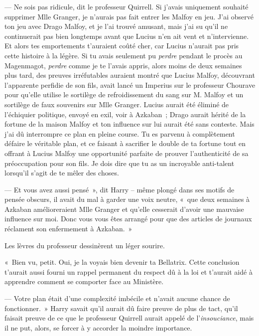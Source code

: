 --- Ne sois pas ridicule, dit le professeur Quirrell.
Si j'avais uniquement souhaité supprimer Mlle Granger, je n'aurais pas fait entrer les Malfoy en jeu.
J'ai observé ton jeu avec Drago Malfoy, et je l'ai trouvé amusant, mais j'ai su qu'il ne continuerait pas bien longtemps avant que Lucius n'en ait vent et n'intervienne.
Et alors tes emportements t'auraient coûté cher, car Lucius n'aurait pas pris cette histoire à la légère.
Si tu avais seulement pu \emph{perdre} pendant le procès au Magenmagot, \emph{perdre} comme je te l'avais appris, alors moins de deux semaines plus tard, des preuves irréfutables auraient montré que Lucius Malfoy, découvrant l'apparente perfidie de son fils, avait lancé un Imperius sur le professeur Chourave pour qu'elle utilise le sortilège de refroidissement du sang sur M. Malfoy et un sortilège de faux souvenirs sur Mlle Granger.
Lucius aurait été éliminé de l'échiquier politique, envoyé en exil, voir à Azkaban~; Drago aurait hérité de la fortune de la maison Malfoy et ton influence sur lui aurait été sans conteste.
Mais j'ai dû interrompre ce plan en pleine course.
Tu es parvenu à complètement défaire le véritable plan, et ce faisant à sacrifier le double de ta fortune tout en offrant à Lucius Malfoy une opportunité parfaite de prouver l'authenticité de sa préoccupation pour son fils.
Je dois dire que tu as un incroyable anti-talent lorsqu'il s'agit de te mêler des choses.

--- Et vous avez aussi pensé~», dit Harry -- même plongé dans ses motifs de pensée obscurs, il avait du mal à garder une voix neutre, «~que deux semaines à Azkaban amélioreraient Mlle Granger et qu'elle cesserait d'avoir une mauvaise influence sur moi.
Donc vous vous êtes arrangé pour que des articles de journaux réclament son enfermement à Azkaban.~»

Les lèvres du professeur dessinèrent un léger sourire.

«~Bien vu, petit.
Oui, je la voyais bien devenir ta Bellatrix.
Cette conclusion t'aurait aussi fourni un rappel permanent du respect dû à la loi et t'aurait aidé à apprendre comment se comporter face au Ministère.

--- Votre plan était d'une complexité imbécile et n'avait aucune chance de fonctionner.~»
Harry savait qu'il aurait dû faire preuve de plus de tact, qu'il faisait preuve de ce que le professeur Quirrell aurait appelé de l'\emph{insouciance}, mais il ne put, alors, se forcer à y accorder la moindre importance.

